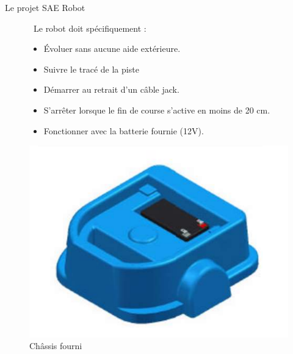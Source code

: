  \begin{frame}{Le projet SAE Robot}
    \begin{figure}[H]
        \centering
        \begin{minipage}{.5\textwidth}
            \
            Le robot doit spécifiquement : 
            \begin{itemize}
                \item Évoluer sans aucune aide extérieure.
                \item Suivre le tracé de la piste
                \item Démarrer au retrait d’un câble jack.
                \item S'arrêter lorsque le fin de course s’active en moins de 20 cm.
                \item Fonctionner avec la batterie fournie (12V).
            \end{itemize}
        \end{minipage}%
        \begin{minipage}{.5\textwidth}
            \centering
            \includegraphics[width=.5\linewidth]{Images/carcasse.png}
            \caption{Châssis fourni}
        \label{fig:carcasse}
        \end{minipage}
    \end{figure}

\vfill\footer{\hfill\insertframenumber/\inserttotalframenumber}
 \end{frame}